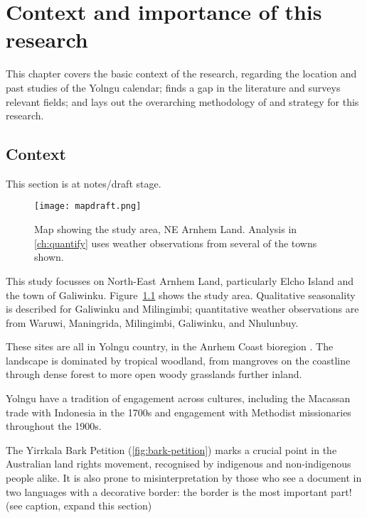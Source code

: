 \chapter{Context and importance of this research}
\label{ch:context}
This chapter covers the basic context of the research,
regarding the location and past studies of the Yolngu calendar;
finds a gap in the literature and surveys relevant fields;
and lays out the overarching methodology of and strategy for this research.


\section{Context}
This section is at notes/draft stage.

\begin{figure}[h]
    \centering
    \texttt{[image: mapdraft.png]}
    \caption[Map showing the study area, NE Arnhem Land]{
        Map showing the study area, NE Arnhem Land.
        Analysis in \autoref{ch:quantify} uses weather observations from several of the towns shown.
        }
    \label{fig:arnhem-map}
\end{figure}


This study focusses on North-East Arnhem Land, particularly Elcho Island
and the town of Galiwinku.  Figure~\ref{fig:arnhem-map} shows the study area.
Qualitative seasonality is described for Galiwinku and Milingimbi;
quantitative weather observations are from Waruwi, Maningrida, Milingimbi,
Galiwinku, and Nhulunbuy.

These sites are all in Yolngu country, in the Anrhem Coast bioregion \citep{ens2014}.
The landscape is dominated by tropical woodland, from mangroves on the coastline 
through dense forest to more open woody grasslands further inland.

Yolngu have a tradition of engagement across cultures, including
the Macassan trade with Indonesia in the 1700s and engagement with Methodist
missionaries throughout the 1900s.

The Yirrkala Bark Petition (\autoref{fig:bark-petition}) marks a crucial
point in the Australian land rights movement, recognised by indigenous and
non-indigenous people alike.  It is also prone to misinterpretation by those
who see a document in two languages with a decorative border: the border
is the most important part!  (see caption, expand this section)


